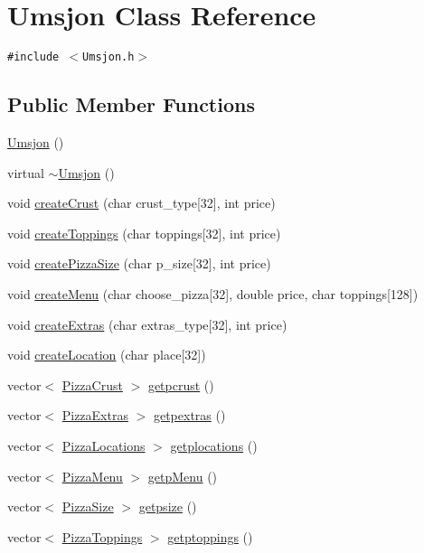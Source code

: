 \hypertarget{class_umsjon}{
\section{Umsjon Class Reference}
\label{class_umsjon}
}
{\tt \#include $<$Umsjon.h$>$}

\subsection*{Public Member Functions}
\begin{CompactItemize}
\item 
\hyperlink{class_umsjon_1f89bef332176cd139fa5f900d4735b6}{Umsjon} ()
\item 
virtual \hyperlink{class_umsjon_0e6a6c83c46b16695a818c39dd4a700a}{$\sim$Umsjon} ()
\item 
void \hyperlink{class_umsjon_75c9c243db5456ca368b8cdc6f617603}{create\-Crust} (char crust\_\-type\mbox{[}32\mbox{]}, int price)
\item 
void \hyperlink{class_umsjon_b4c5d68540dc069a5871e57482a44454}{create\-Toppings} (char toppings\mbox{[}32\mbox{]}, int price)
\item 
void \hyperlink{class_umsjon_9b94d4f7ba3bbc2c46cc7bdce8f09d61}{create\-Pizza\-Size} (char p\_\-size\mbox{[}32\mbox{]}, int price)
\item 
void \hyperlink{class_umsjon_ce183afe9e7ad9a7492ac2241e2481e5}{create\-Menu} (char choose\_\-pizza\mbox{[}32\mbox{]}, double price, char toppings\mbox{[}128\mbox{]})
\item 
void \hyperlink{class_umsjon_b3b4384d1b6159cee7aab19dc1ff23eb}{create\-Extras} (char extras\_\-type\mbox{[}32\mbox{]}, int price)
\item 
void \hyperlink{class_umsjon_6827be731c8d50370297264676be442f}{create\-Location} (char place\mbox{[}32\mbox{]})
\item 
vector$<$ \hyperlink{class_pizza_crust}{Pizza\-Crust} $>$ \hyperlink{class_umsjon_1ba4091781dbf5acfd11d9bbd3c476c1}{getpcrust} ()
\item 
vector$<$ \hyperlink{class_pizza_extras}{Pizza\-Extras} $>$ \hyperlink{class_umsjon_48a5a2fa53cb3c40c681bd053598876b}{getpextras} ()
\item 
vector$<$ \hyperlink{class_pizza_locations}{Pizza\-Locations} $>$ \hyperlink{class_umsjon_a84f9abb849190a11dfcb3f0d5d619cc}{getplocations} ()
\item 
vector$<$ \hyperlink{class_pizza_menu}{Pizza\-Menu} $>$ \hyperlink{class_umsjon_729f51349769ff866a7cf5d79d381c2b}{getp\-Menu} ()
\item 
vector$<$ \hyperlink{class_pizza_size}{Pizza\-Size} $>$ \hyperlink{class_umsjon_fffa683bcf55b44d751ab146b21b3ae9}{getpsize} ()
\item 
vector$<$ \hyperlink{class_pizza_toppings}{Pizza\-Toppings} $>$ \hyperlink{class_umsjon_63e370dface20065bb6dde6d38ea4287}{getptoppings} ()
\end{CompactItemize}


